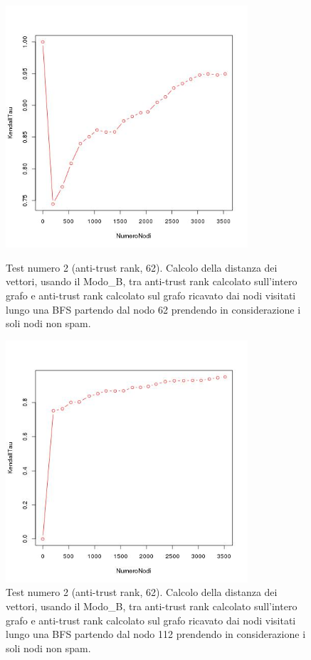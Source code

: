 \begin{figure}
\centering
 \includegraphics[height=9cm]{immagini/test2/antiTrustraktGoodNodesTestMode1_62}
 \caption{Test numero 2 (anti-trust rank, 62). Calcolo della distanza dei vettori, usando il Modo\_B, tra anti-trust rank calcolato sull'intero grafo e anti-trust rank calcolato sul grafo ricavato dai nodi visitati lungo una BFS partendo dal nodo 62 prendendo in considerazione i soli nodi non spam. }
 \label{fig:test2antitrustModoB62}
\centering
 \includegraphics[height=9cm]{immagini/test2/antiTrustraktGoodNodesTestMode1_112}
 \caption{Test numero 2 (anti-trust rank, 62). Calcolo della distanza dei vettori, usando il Modo\_B, tra anti-trust rank calcolato sull'intero grafo e anti-trust rank calcolato sul grafo ricavato dai nodi visitati lungo una BFS partendo dal nodo 112 prendendo in considerazione i soli nodi non spam. }
 \label{fig:test2antitrustModoB112}
\end{figure}





